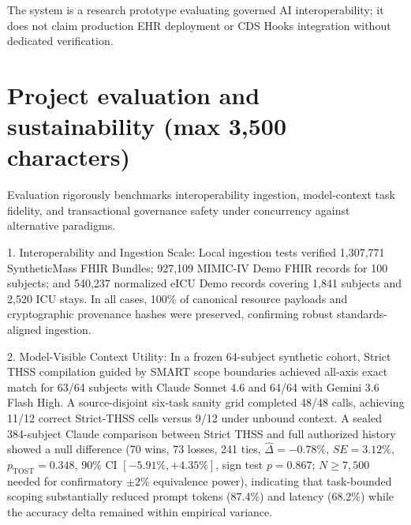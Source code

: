 \documentclass[10pt,letterpaper]{article}
\begin{document}
The system is a research prototype evaluating governed AI interoperability; it does not claim production EHR deployment or CDS Hooks integration without dedicated verification.

\section{Project evaluation and sustainability (max 3,500 characters)}
Evaluation rigorously benchmarks interoperability ingestion, model-context task fidelity, and transactional governance safety under concurrency against alternative paradigms.

1. Interoperability and Ingestion Scale: Local ingestion tests verified 1,307,771 SyntheticMass FHIR Bundles; 927,109 MIMIC-IV Demo FHIR records for 100 subjects; and 540,237 normalized eICU Demo records covering 1,841 subjects and 2,520 ICU stays. In all cases, 100\% of canonical resource payloads and cryptographic provenance hashes were preserved, confirming robust standards-aligned ingestion.

2. Model-Visible Context Utility: In a frozen 64-subject synthetic cohort, Strict THSS compilation guided by SMART scope boundaries achieved all-axis exact match for 63/64 subjects with Claude Sonnet 4.6 and 64/64 with Gemini 3.6 Flash High. A source-disjoint six-task sanity grid completed 48/48 calls, achieving 11/12 correct Strict-THSS cells versus 9/12 under unbound context. A sealed 384-subject Claude comparison between Strict THSS and full authorized history showed a null difference (70 wins, 73 losses, 241 ties, $\hat{\Delta} = -0.78\%$, $SE = 3.12\%$, $p_{\text{TOST}} = 0.348$, 90\% CI $[-5.91\%, +4.35\%]$, sign test $p=0.867$; $N \ge 7{,}500$ needed for confirmatory $\pm 2\%$ equivalence power), indicating that task-bounded scoping substantially reduced prompt tokens (87.4\%) and latency (68.2\%) while the accuracy delta remained within empirical variance.
\end{document}
